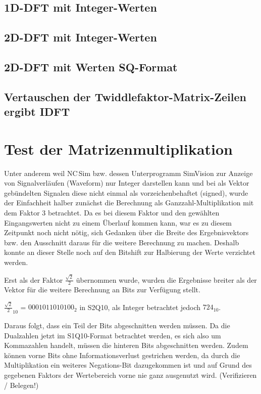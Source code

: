 \subsection{1D-DFT mit Integer-Werten}
 
\subsection{2D-DFT mit Integer-Werten}

\subsection{2D-DFT mit Werten SQ-Format}

\subsection{Vertauschen der Twiddlefaktor-Matrix-Zeilen ergibt IDFT}

\section{Test der Matrizenmultiplikation}
Unter anderem weil NC\,Sim bzw. dessen Unterprogramm SimVision zur Anzeige von Signalverläufen (Waveform) nur Integer darstellen kann und bei als Vektor gebündelten Signalen 
diese nicht einmal als vorzeichenbehaftet (signed), wurde der Einfachheit halber zunächst die Berechnung als Ganzzahl-Multiplikation mit dem Faktor 3 betrachtet. 
Da es bei diesem Faktor und den gewählten Eingangswerten nicht zu einem 
Überlauf kommen kann, war es zu diesem Zeitpunkt noch nicht nötig, sich Gedanken über die Breite des Ergebnisvektors bzw. den Ausschnitt daraus für die weitere
Berechnung zu machen. Deshalb konnte an dieser Stelle noch auf den Bitshift zur Halbierung der Werte verzichtet werden.

Erst als der Faktor $\frac{\sqrt{2}}{2}$ übernommen wurde, wurden die Ergebnisse breiter als der Vektor für die weitere Berechnung an Bits zur Verfügung stellt.

${\frac{\sqrt{2}}{2}}_{10}$ = $0001011010100_2$ in S2Q10, als Integer betrachtet jedoch $724_{10}$.

Daraus folgt, dass ein Teil der Bits abgeschnitten werden müssen. Da die Dualzahlen jetzt im S1Q10-Format betrachtet werden, es sich also um Kommazahlen handelt,
müssen die hinteren Bits abgeschnitten werden. Zudem können vorne Bits ohne Informationsverlust gestrichen werden, da durch die Multiplikation ein weiteres 
Negations-Bit dazugekommen ist und auf Grund des gegebenen Faktors der Wertebereich vorne nie ganz ausgenutzt wird. (Verifizieren / Belegen!)


